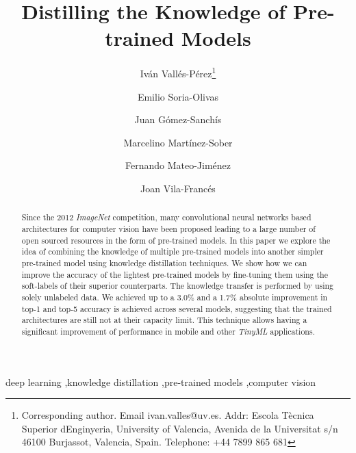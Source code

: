 \documentclass{elsarticle}
\begin{document}
	\begin{frontmatter}
		\title{Distilling the Knowledge of Pre-trained Models}
		\author[UV]{Iván Vallés-Pérez\footnote{Corresponding author. Email ivan.valles@uv.es. Addr: Escola Tècnica Superior d\textsc{}Enginyeria, University of Valencia, Avenida de la Universitat s/n 46100 Burjassot, Valencia, Spain.  Telephone: +44 7899 865 681}}
		\author[UV]{Emilio Soria-Olivas}
		\author[UV]{Juan Gómez-Sanchís}
		\author[UV]{Marcelino Martínez-Sober}%
		\author[UV]{Fernando Mateo-Jiménez}
		\author[UV]{Joan Vila-Francés}
		\address[UV]{Escola Tècnica Superior d\textsc{}Enginyeria, University of Valencia, Avenida de la Universitat s/n 46100 Burjassot, Valencia, Spain. \\ ivan.valles@uv.es, emilio.soria@uv.es, juan.gomez-sanchis@uv.es, marcelino.martinez@uv.es, fernando.mateo@uv.es, joan.vila@uv.es}

		\begin{abstract}
		Since the 2012 \textit{ImageNet} competition, many convolutional neural networks based architectures for computer vision have been proposed leading to a large number of open sourced resources in the form of pre-trained models. In this paper we explore the idea of combining the knowledge of multiple pre-trained models into another simpler pre-trained model using knowledge distillation techniques. We show how we can improve the accuracy of the lightest pre-trained models by fine-tuning them using the soft-labels of their superior counterparts. The knowledge transfer is performed by using solely unlabeled data. We achieved up to a 3.0\% and a 1.7\% absolute improvement in top-1 and top-5 accuracy is achieved across several models, suggesting that the trained architectures are still not at their capacity limit. This technique allows having a significant improvement of performance in mobile and other \textit{TinyML} applications.
		\end{abstract}
		
		\begin{keyword}
			deep learning \sep knowledge distillation \sep pre-trained models \sep computer vision  
		\end{keyword}
		
	\end{frontmatter}
	
	\linenumbers
	
\end{document}
